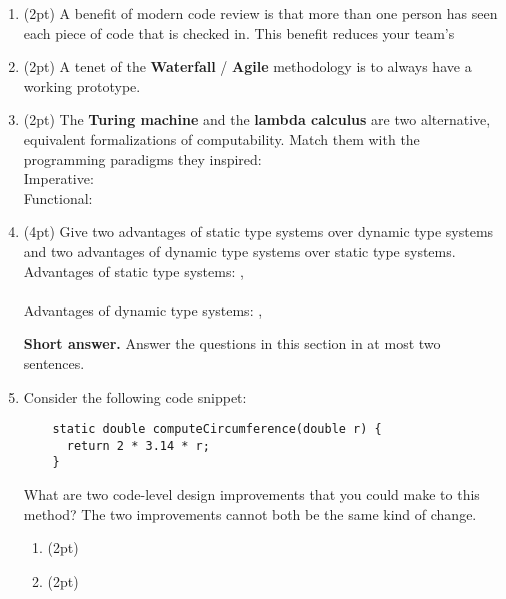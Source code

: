 \documentclass{report}
\newif\ifkey
\newcommand{\correct}[1]{\ifkey\color{red}\textbf{#1}\color{black}\else\textbf{#1}\fi\xspace}
\newcommand{\answershort}[1]{\ifkey\color{red}\underline{\textbf{#1}}\color{black}\else\underline{\hspace{3in}}\fi\xspace}
\newcommand*{\pts}[1]{\addtocounter{points}{#1}(#1pt)}
\begin{document}
\begin{spacing}{1.4}
\begin{enumerate}[leftmargin=*]
\item \pts{2}
  A benefit of modern code review is that more than one person has seen each piece of code that is checked in. This benefit
  reduces your team's \answershort{bus factor}

\item \pts{2}
  A tenet of the \textbf{Waterfall} / \correct{Agile} methodology is to always have a working prototype.

\item \pts{2}
  The \textbf{Turing machine} and the \textbf{lambda calculus} are two alternative, equivalent formalizations of computability.
  Match them with the programming paradigms they inspired: \\
  Imperative: \answershort{Turing machine} \\
  Functional: \answershort{lambda calculus}

\item \pts{4} Give two advantages of static type systems over dynamic type systems and two advantages of dynamic type systems over
  static type systems. \\
  Advantages of static type systems: \answershort{early detection of errors},\\ \answershort{types are documentation} \\
  Advantages of dynamic type systems: \answershort{faster prototyping},\\ \answershort{no false positives}

  
  \newpage

  \textbf{Short answer.} Answer the questions in this section in at most two sentences.

\item Consider the following code snippet: \\
  \begin{lstlisting}
    static double computeCircumference(double r) {
      return 2 * 3.14 * r;
    }
  \end{lstlisting}

  What are two code-level design improvements that you could make to this method? The two improvements cannot both be the same kind of change.
  \begin{enumerate}
  \item \pts{2} \answershort{replace 3.14 with a PI constant} 
  \item \pts{2} \answershort{rename ``r'' to ``radius'' or rename ``computeCircumference'' to ``circumference''}


\end{enumerate}
\end{enumerate}
\end{spacing}
\end{document}
